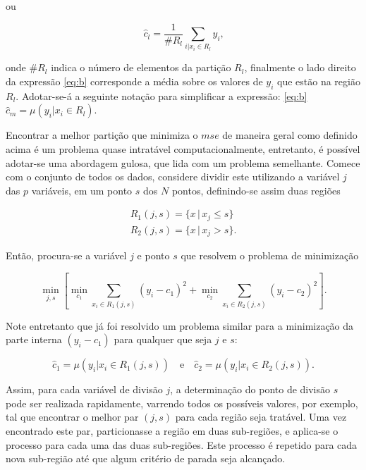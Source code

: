 ou

\begin{equation}\label{eq:b}
\hat{c}_l=\frac{1}{\#R_l}\sum_{i|x_i \in{R_l}}y_i\mbox{,}
\end{equation}

onde $\#R_l$ indica o número de elementos da partição $R_l$, finalmente o lado direito da expressão \eqref{eq:b} corresponde a média sobre os valores de $y_i$ que estão na região $R_l$. Adotar-se-á a seguinte notação para simplificar a expressão: \eqref{eq:b} $\hat{c}_m=\mu(y_i|x_i\in{R_l})$.

Encontrar a melhor partição que minimiza o $mse$ de maneira geral como definido acima é um problema quase intratável computacionalmente, entretanto, é possível adotar-se uma abordagem gulosa, que lida com um problema semelhante. Comece com o conjunto de todos os dados, considere dividir este utilizando a variável $j$ das $p$ variáveis, em um ponto $s$ dos $N$ pontos, definindo-se assim duas regiões

\begin{align}
R_1(j,s) = \{x\,|\,x_j\le{s}\}\\
R_2(j,s) = \{x\,|\,x_j>s\}\mbox{.}
\end{align}

Então, procura-se a variável $j$ e ponto $s$ que resolvem o problema de minimização

\begin{equation}
\min_{j,s}\left[\min_{c_1}\sum_{x_i\in{R_1(j,s)}}(y_i-c_1)^2+\min_{c_2}\sum_{x_i\in{R_2(j,s)}}(y_i-c_2)^2\right]\mbox{.}
\end{equation}

Note entretanto que já foi resolvido um problema similar para a minimização da parte interna $(y_i-c_1)$ para qualquer que seja $j$ e $s$:

\begin{equation}
\hat{c}_1=\mu(y_i|x_i\in{R_1(j,s)})\quad\mbox{e}\quad\hat{c}_2=\mu(y_i|x_i\in{R_2(j,s)})\mbox{.}
\end{equation}

Assim, para cada variável de divisão $j$, a determinação do ponto de divisão $s$ pode ser realizada rapidamente, varrendo todos os possíveis valores, por exemplo, tal que encontrar o melhor par $(j,s)$ para cada região seja tratável. Uma vez encontrado este par, particionasse a região em duas sub-regiões, e aplica-se o processo para cada uma das duas sub-regiões. Este processo é repetido para cada nova sub-região até que algum critério de parada seja alcançado.

